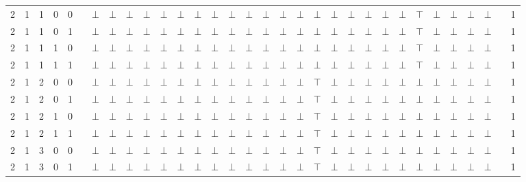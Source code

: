 \documentclass[12pt]{extarticle}
\begin{document}
\begin{landscape}
\begin{tiny}
\begin{longtable}[c]{llllllllllllllllllllllllllllllll}
2 & 1 & 1 & 0 & 0 &  & $\bot$ & $\bot$ & $\bot$ & $\bot$ & $\bot$ & $\bot$ & $\bot$ & $\bot$ & $\bot$ & $\bot$ & $\bot$ & $\bot$ & $\bot$ & $\bot$ & $\bot$ & $\bot$ & $\bot$ & $\bot$ & $\bot$ & $\top$ & $\bot$ & $\bot$ & $\bot$ & $\bot$ &  & 1 \\
2 & 1 & 1 & 0 & 1 &  & $\bot$ & $\bot$ & $\bot$ & $\bot$ & $\bot$ & $\bot$ & $\bot$ & $\bot$ & $\bot$ & $\bot$ & $\bot$ & $\bot$ & $\bot$ & $\bot$ & $\bot$ & $\bot$ & $\bot$ & $\bot$ & $\bot$ & $\top$ & $\bot$ & $\bot$ & $\bot$ & $\bot$ &  & 1 \\
2 & 1 & 1 & 1 & 0 &  & $\bot$ & $\bot$ & $\bot$ & $\bot$ & $\bot$ & $\bot$ & $\bot$ & $\bot$ & $\bot$ & $\bot$ & $\bot$ & $\bot$ & $\bot$ & $\bot$ & $\bot$ & $\bot$ & $\bot$ & $\bot$ & $\bot$ & $\top$ & $\bot$ & $\bot$ & $\bot$ & $\bot$ &  & 1 \\
2 & 1 & 1 & 1 & 1 &  & $\bot$ & $\bot$ & $\bot$ & $\bot$ & $\bot$ & $\bot$ & $\bot$ & $\bot$ & $\bot$ & $\bot$ & $\bot$ & $\bot$ & $\bot$ & $\bot$ & $\bot$ & $\bot$ & $\bot$ & $\bot$ & $\bot$ & $\top$ & $\bot$ & $\bot$ & $\bot$ & $\bot$ &  & 1 \\
2 & 1 & 2 & 0 & 0 &  & $\bot$ & $\bot$ & $\bot$ & $\bot$ & $\bot$ & $\bot$ & $\bot$ & $\bot$ & $\bot$ & $\bot$ & $\bot$ & $\bot$ & $\bot$ & $\top$ & $\bot$ & $\bot$ & $\bot$ & $\bot$ & $\bot$ & $\bot$ & $\bot$ & $\bot$ & $\bot$ & $\bot$ &  & 1 \\
2 & 1 & 2 & 0 & 1 &  & $\bot$ & $\bot$ & $\bot$ & $\bot$ & $\bot$ & $\bot$ & $\bot$ & $\bot$ & $\bot$ & $\bot$ & $\bot$ & $\bot$ & $\bot$ & $\top$ & $\bot$ & $\bot$ & $\bot$ & $\bot$ & $\bot$ & $\bot$ & $\bot$ & $\bot$ & $\bot$ & $\bot$ &  & 1 \\
2 & 1 & 2 & 1 & 0 &  & $\bot$ & $\bot$ & $\bot$ & $\bot$ & $\bot$ & $\bot$ & $\bot$ & $\bot$ & $\bot$ & $\bot$ & $\bot$ & $\bot$ & $\bot$ & $\top$ & $\bot$ & $\bot$ & $\bot$ & $\bot$ & $\bot$ & $\bot$ & $\bot$ & $\bot$ & $\bot$ & $\bot$ &  & 1 \\
2 & 1 & 2 & 1 & 1 &  & $\bot$ & $\bot$ & $\bot$ & $\bot$ & $\bot$ & $\bot$ & $\bot$ & $\bot$ & $\bot$ & $\bot$ & $\bot$ & $\bot$ & $\bot$ & $\top$ & $\bot$ & $\bot$ & $\bot$ & $\bot$ & $\bot$ & $\bot$ & $\bot$ & $\bot$ & $\bot$ & $\bot$ &  & 1 \\
2 & 1 & 3 & 0 & 0 &  & $\bot$ & $\bot$ & $\bot$ & $\bot$ & $\bot$ & $\bot$ & $\bot$ & $\bot$ & $\bot$ & $\bot$ & $\bot$ & $\bot$ & $\bot$ & $\top$ & $\bot$ & $\bot$ & $\bot$ & $\bot$ & $\bot$ & $\bot$ & $\bot$ & $\bot$ & $\bot$ & $\bot$ &  & 1 \\
2 & 1 & 3 & 0 & 1 &  & $\bot$ & $\bot$ & $\bot$ & $\bot$ & $\bot$ & $\bot$ & $\bot$ & $\bot$ & $\bot$ & $\bot$ & $\bot$ & $\bot$ & $\bot$ & $\top$ & $\bot$ & $\bot$ & $\bot$ & $\bot$ & $\bot$ & $\bot$ & $\bot$ & $\bot$ & $\bot$ & $\bot$ &  & 1 \\

\end{longtable}
\end{tiny}
\end{landscape}
\end{document}
